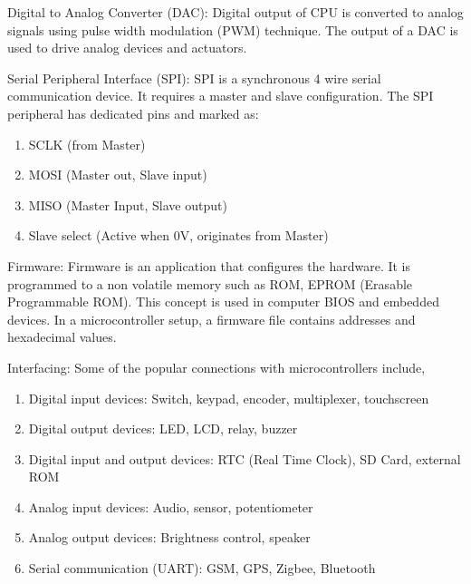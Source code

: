 \begin{description}
\item {Digital to Analog Converter (DAC):} Digital output of CPU is
  converted to analog signals using pulse width modulation (PWM)
  technique. The output of a DAC is used to drive analog devices and actuators.

\item {Serial Peripheral Interface (SPI):} SPI is a synchronous 4 wire
  serial communication device. It requires a master and slave
  configuration. The SPI peripheral has dedicated pins and marked
  as:
  \begin{enumerate}
  \item SCLK (from Master)
  \item MOSI (Master out, Slave input)
  \item MISO (Master Input, Slave output)
  \item Slave select (Active when 0V, originates from Master)
  \end{enumerate}

\item {Firmware:} Firmware is an application that configures the
  hardware. It is programmed to a non volatile memory such as ROM,
  EPROM (Erasable Programmable ROM). This concept is used in computer
  BIOS and embedded devices.  In a microcontroller setup, a firmware
  file contains addresses and hexadecimal values.

\item{Interfacing:} Some of the popular connections with microcontrollers include,
  \begin{enumerate}
  \item Digital input devices: Switch, keypad, encoder, multiplexer,
    touchscreen
  \item Digital output devices: LED, LCD, relay, buzzer
  \item Digital input and output devices: RTC (Real Time Clock),
    SD Card, external ROM
  \item Analog input devices: Audio, sensor, potentiometer
  \item Analog output devices: Brightness control, speaker
  \item Serial communication (UART): GSM, GPS, Zigbee, Bluetooth
  \end{enumerate}
\end{description}

